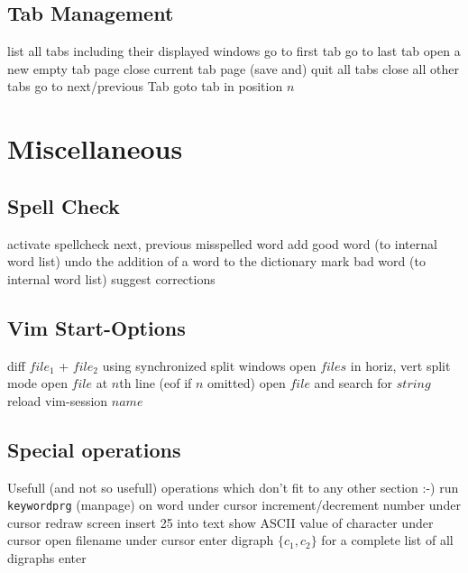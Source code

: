 \subsection{Tab Management}	{}
	{list all tabs including their displayed windows}
	{go to first tab}
	{go to last tab}
	{open a new empty tab page}
	{close current tab page}
	{(save and) quit all tabs}
	{close all other tabs}
	{go to next/previous Tab}
	{goto tab in position $n$ }

\section{Miscellaneous}	{}

\subsection{Spell Check}	{}
	{activate spellcheck}
\cmdS{]s\ [s }	{next, previous misspelled word}
	{add good word (to internal word list)}
	{undo the addition of a word to the dictionary}
	{mark bad word (to internal word list)}
	{suggest corrections}

\subsection{Vim Start-Options}	{}
	{diff $file_1$ + $file_2$ using synchronized split windows}
	{open $files$ in horiz, vert split mode}
	{open $file$ at $n$th line (eof if $n$ omitted)}
	{open $file$ and search for $string$ }
	{reload vim-session $name$}

\subsection{Special operations}	{Usefull (and not so usefull) operations which don't fit to any other section :-)}
	{run {\tt keywordprg} (manpage) on word under cursor}
	{increment/decrement number under cursor}
	{redraw screen}
	{insert 25 into text}
	{show A{\smallrm SCII} value of character under cursor}
	{open filename under cursor}
	{enter digraph $\{c_1,c_2\}$}
	{for a complete list of all digraphs enter}

